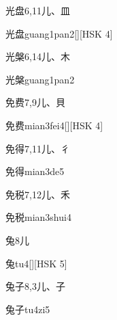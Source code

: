 \begin{entry}{光盘}{6,11}{⼉、⽫}
  \begin{phonetics}{光盘}{guang1pan2}[][HSK 4]
  \end{phonetics}
\end{entry}

\begin{entry}{光槃}{6,14}{⼉、⽊}
  \begin{phonetics}{光槃}{guang1pan2}
  \end{phonetics}
\end{entry}

\begin{entry}{免费}{7,9}{⼉、⾙}
  \begin{phonetics}{免费}{mian3fei4}[][HSK 4]
  \end{phonetics}
\end{entry}

\begin{entry}{免得}{7,11}{⼉、⼻}
  \begin{phonetics}{免得}{mian3de5}
  \end{phonetics}
\end{entry}

\begin{entry}{免税}{7,12}{⼉、⽲}
  \begin{phonetics}{免税}{mian3shui4}
  \end{phonetics}
\end{entry}

\begin{entry}{兔}{8}{⼉}
  \begin{phonetics}{兔}{tu4}[][HSK 5]
  \end{phonetics}
\end{entry}

\begin{entry}{兔子}{8,3}{⼉、⼦}
  \begin{phonetics}{兔子}{tu4zi5}
  \end{phonetics}
\end{entry}


